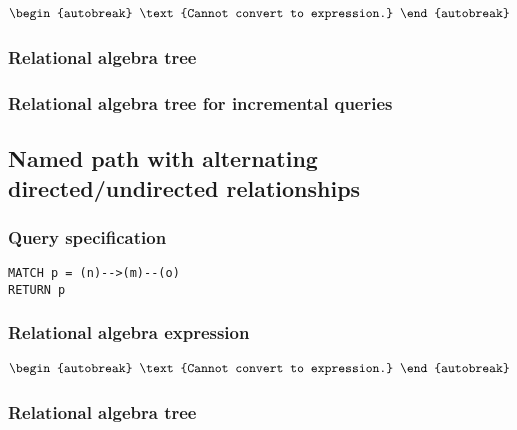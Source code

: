 \begin{align*}
\begin{autobreak}
\text{Cannot convert to expression.}
\end{autobreak}
\end{align*}

\subsubsection*{Relational algebra tree}


\subsubsection*{Relational algebra tree for incremental queries}


\subsection{Named path with alternating directed/undirected relationships}

\subsubsection*{Query specification}

\begin{lstlisting}
MATCH p = (n)-->(m)--(o)
RETURN p
\end{lstlisting}

\subsubsection*{Relational algebra expression}

\begin{align*}
\begin{autobreak}
\text{Cannot convert to expression.}
\end{autobreak}
\end{align*}

\subsubsection*{Relational algebra tree}


